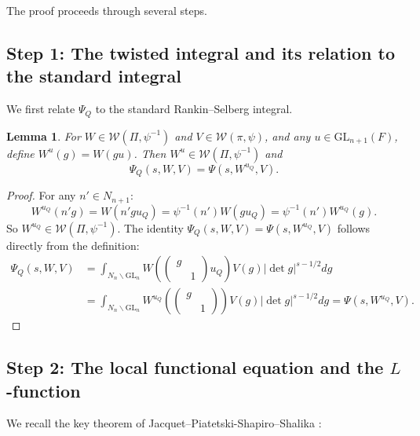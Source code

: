 \documentclass[12pt]{article}
\newtheorem{lemma}[theorem]{Lemma}
\begin{document}
The proof proceeds through several steps.

\subsection{Step 1: The twisted integral and its relation to the standard integral}

We first relate $\Psi_Q$ to the standard Rankin--Selberg integral.

\begin{lemma}\label{lem:twist}
For $W \in \mathcal{W}(\Pi, \psi^{-1})$ and $V \in \mathcal{W}(\pi, \psi)$, and any $u \in \mathrm{GL}_{n+1}(F)$, define $W^u(g) = W(gu)$. Then $W^u \in \mathcal{W}(\Pi, \psi^{-1})$ and
\[
\Psi_Q(s, W, V) = \Psi(s, W^{u_Q}, V).
\]
\end{lemma}

\begin{proof}
For any $n' \in N_{n+1}$:
\[
W^{u_Q}(n'g) = W(n'gu_Q) = \psi^{-1}(n') W(gu_Q) = \psi^{-1}(n') W^{u_Q}(g).
\]
So $W^{u_Q} \in \mathcal{W}(\Pi, \psi^{-1})$. The identity $\Psi_Q(s,W,V) = \Psi(s, W^{u_Q}, V)$ follows directly from the definition:
\begin{align*}
\Psi_Q(s,W,V) &= \int_{N_n\backslash\mathrm{GL}_n} W\!\left(\begin{pmatrix}g\\&1\end{pmatrix}u_Q\right)V(g)|\det g|^{s-1/2}dg \\
&= \int_{N_n\backslash\mathrm{GL}_n} W^{u_Q}\!\left(\begin{pmatrix}g\\&1\end{pmatrix}\right)V(g)|\det g|^{s-1/2}dg = \Psi(s,W^{u_Q},V).
\end{align*}
\end{proof}

\subsection{Step 2: The local functional equation and the $L$-function}

We recall the key theorem of Jacquet--Piatetski-Shapiro--Shalika \cite{JPSS1983}:
\end{document}
